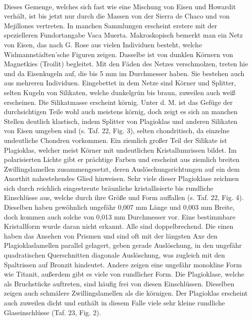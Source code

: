 \documentclass[a4paper, 11pt, oneside, polutonikogreek, german]{article}
\begin{document}
\paragraph{}
Dieses Gemenge, welches sich fast wie eine Mischung von Eisen und Howardit verhält, ist bis jetzt nur durch die Massen von der Sierra de Chaco und von Mejillones vertreten. In manchen Sammlungen erscheint erstere mit der spezielleren Fundortangabe Vaca Muerta. Makroskopisch bemerkt man ein Netz von Eisen, das nach G. Rose aus vielen Individuen besteht, welche Widmannstädten'sche Figuren zeigen. Dasselbe ist von dunklen Körnern von Magnetkies (Troilit) begleitet. Mit den Fäden des Netzes verschmolzen, treten hie und da Eisenkugeln auf, die bis 5 mm im Durchmesser haben. Sie bestehen auch aus mehreren Individuen. Eingebettet in dem Netze sind Körner und Splitter, selten Kugeln von Silikaten, welche dunkelgrün bis braun, zuweilen auch weiß erscheinen. Die Silikatmasse erscheint körnig. Unter d. M. ist das Gefüge der durchsichtigen Teile wohl auch meistens körnig, doch zeigt es sich an manchen Stellen deutlich klastisch, indem Splitter von Plagioklas und anderen Silikaten von Eisen umgeben sind (s. Taf. 22, Fig. 3), selten chondritisch, da einzelne undeutliche Chondren vorkommen. Ein ziemlich großer Teil der Silikate ist Plagioklas, welcher meist Körner mit undeutlichen Kristallumrissen bildet. Im polarisierten Lichte gibt er prächtige Farben und erscheint aus ziemlich breiten Zwillingslamellen zusammengesetzt, deren Auslöschungsrichtungen auf ein dem Anorthit nahestehendes Glied hinweisen. Sehr viele dieser Plagioklase zeichnen sich durch reichlich eingestreute bräunliche kristallisierte bis rundliche Einschlüsse aus, welche durch ihre Größe und Form auffallen (s. Taf. 22, Fig. 4). Dieselben haben gewöhnlich ungefähr 0,007 mm Länge und 0,003 mm Breite, doch kommen auch solche von 0,013 mm Durchmesser vor. Eine bestimmbare Kristallform wurde daran nicht erkannt. Alle sind doppelbrechend. Die einen haben das Ansehen von Prismen und sind oft mit der längsten Axe den Plagioklaslamellen parallel gelagert, geben gerade Auslöschung, in den ungefähr quadratischen Querschnitten diagonale Auslöschung, was zugleich mit den Spaltrissen auf Bronzit hindeutet. Andere zeigen eine ungefähr monokline Form wie Titanit, außerdem gibt es viele von rundlicher Form. Die Plagioklase, welche als Bruchstücke auftreten, sind häufig frei von diesen Einschlüssen. Dieselben zeigen auch schmälere Zwillingslamellen als die körnigen. Der Plagioklas erscheint auch zuweilen dicht und enthält in diesem Falle viele sehr kleine rundliche Glaseinschlüsse (Taf. 23, Fig. 2).
\end{document}

